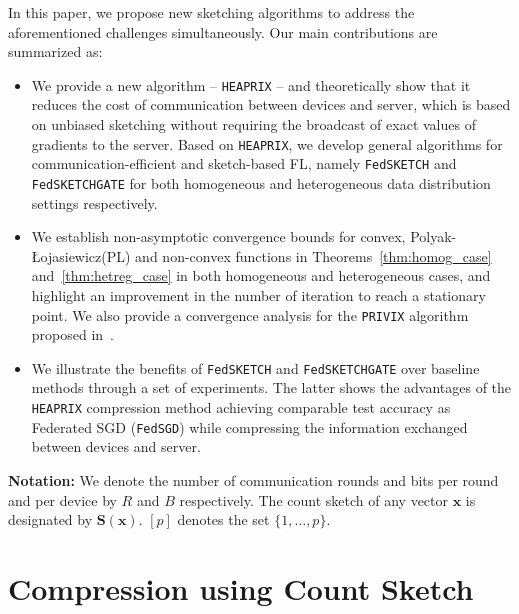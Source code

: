 \documentclass[11pt]{article}
\newcommand{\pl}{Polyak-\L{}ojasiewicz}
\begin{document}
 In this paper, we propose new sketching algorithms to address the aforementioned challenges simultaneously.
 Our main contributions are summarized as:
\begin{itemize}
    \item We provide a new algorithm -- \texttt{HEAPRIX} -- and theoretically show that it reduces the cost of communication between devices and server, which is based on unbiased sketching without requiring the broadcast of exact values of gradients to the server. 
    Based on \texttt{HEAPRIX}, we develop general algorithms for communication-efficient and sketch-based FL, namely \texttt{FedSKETCH} and \texttt{FedSKETCHGATE} for both homogeneous and heterogeneous data distribution settings respectively.
    \item We establish non-asymptotic convergence bounds for convex, \pl\:(PL) and non-convex functions in Theorems~\ref{thm:homog_case} and~\ref{thm:hetreg_case} in both homogeneous and heterogeneous cases, and highlight an improvement in the number of iteration to reach a stationary point.
We also provide a convergence analysis for the \texttt{PRIVIX} algorithm proposed in~\citet{li2019privacy}.
    \item We illustrate the benefits of \texttt{FedSKETCH} and \texttt{FedSKETCHGATE} over baseline methods through a set of experiments. 
    The latter shows the advantages of the \texttt{HEAPRIX} compression method achieving comparable test accuracy as Federated SGD (\texttt{FedSGD}) while compressing the information exchanged between devices and server.
\end{itemize}


\noindent\textbf{Notation:} 
We denote the number of communication rounds and bits per round and per device by $R$ and $B$ respectively. 
The count sketch of any vector $\boldsymbol{x}$ is designated by $\mathbf{S}(\boldsymbol{x})$. $[p]$ denotes the set $\{1,\dots,p\}$.

\vspace{-0.05in}
\section{Compression using Count Sketch}\label{sec:compression}
\vspace{-0.05in}
\end{document}
